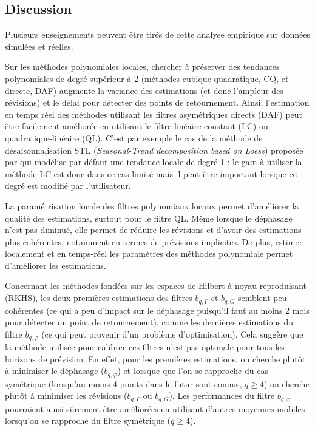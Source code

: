 \documentclass[
  12pt,
  a4paper,french]{article}
\newcommand\1{\mathds{1}}
\begin{document}
\hypertarget{discussion}{%
\subsection{Discussion}\label{discussion}}

Plusieurs enseignements peuvent être tirés de cette analyse empirique sur données simulées et réelles.

Sur les méthodes polynomiales locales, chercher à préserver des tendances polynomiales de degré supérieur à 2 (méthodes cubique-quadratique, CQ, et directe, DAF) augmente la variance des estimations (et donc l'ampleur des révisions) et le délai pour détecter des points de retournement.
Ainsi, l'estimation en temps réel des méthodes utilisant les filtres asymétriques directs (DAF) peut être facilement améliorée en utilisant le filtre linéaire-constant (LC) ou quadratique-linéaire (QL).
C'est par exemple le cas de la méthode de désaisonnalisation STL (\emph{Seasonal-Trend decomposition based on Loess}) proposée par \textcite{cleveland90} qui modélise par défaut une tendance locale de degré 1 : le gain à utiliser la méthode LC est donc dans ce cas limité mais il peut être important lorsque ce degré est modifié par l'utilisateur.

La paramétrisation locale des filtres polynomiaux locaux permet d'améliorer la qualité des estimations, surtout pour le filtre QL.
Même lorsque le déphasage n'est pas diminué, elle permet de réduire les révisions et d'avoir des estimations plus cohérentes, notamment en termes de prévisions implicites.
De plus, estimer localement et en temps-réel les paramètres des méthodes polynomiale permet d'améliorer les estimations.

Concernant les méthodes fondées sur les espaces de Hilbert à noyau reproduisant (RKHS), les deux premières estimations des filtres \(b_{q,\Gamma}\) et \(b_{q,G}\) semblent peu cohérentes (ce qui a peu d'impact sur le déphasage puisqu'il faut au moins 2 mois pour détecter un point de retournement), comme les dernières estimations du filtre \(b_{q,\varphi}\) (ce qui peut provenir d'un problème d'optimisation).
Cela suggère que la méthode utilisée pour calibrer ces filtres n'est pas optimale pour tous les horizons de prévision.
En effet, pour les premières estimations, on cherche plutôt à minimiser le déphasage (\(b_{q,\varphi}\)) et lorsque que l'on se rapproche du cas symétrique (lorsqu'au moins 4 points dans le futur sont connus, \(q \geq 4\)) on cherche plutôt à minimiser les révisions (\(b_{q,\Gamma}\) ou \(b_{q,G}\)).
Les performances du filtre \(b_{q,\varphi}\) pourraient ainsi sûrement être améliorées en utilisant d'autres moyennes mobiles lorsqu'on se rapproche du filtre symétrique (\(q \geq 4\)).
\end{document}
